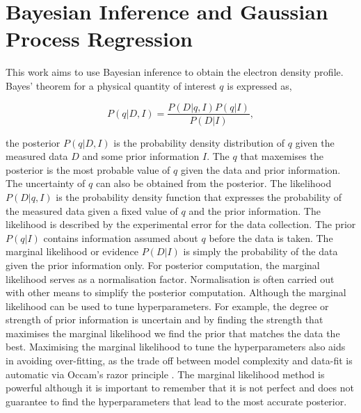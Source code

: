 \section{Bayesian Inference and Gaussian Process Regression}\label{sec:BIandGPR}

This work aims to use Bayesian inference to obtain the electron density profile. Bayes' theorem for a physical quantity of interest $q$ is expressed as,

\begin{equation} 
  P(q|D,I) = \frac{P(D|q,I) P(q|I)}{P(D|I)},
  \label{eq:bayesth}
\end{equation}

\noindent the posterior $P(q|D,I)$ is the probability density distribution of $q$ given the measured data $D$ and some prior information $I$. The $q$ that maxemises the posterior is the most probable value of $q$ given the data and prior information. The uncertainty of $q$ can also be obtained from the posterior. The likelihood $P(D|q,I)$ is the probability density function that expresses the probability of the measured data given a fixed value of $q$ and the prior information. The likelihood is described by the experimental error for the data collection. The prior $P(q|I)$ contains information assumed about $q$ before the data is taken. The marginal likelihood or evidence $P(D|I)$ is simply the probability of the data given the prior information only. For posterior computation, the marginal likelihood serves as a normalisation factor. Normalisation is often carried out with other means to simplify the posterior computation. Although the marginal likelihood can be used to tune hyperparameters. For example, the degree or strength of prior information is uncertain and by finding the strength that maximises the marginal likelihood we find the prior that matches the data the best. Maximising the marginal likelihood to tune the hyperparameters also aids in avoiding over-fitting, as the trade off between model complexity and data-fit is automatic via Occam's razor principle \cite{oscraz}. The marginal likelihood method is powerful although it is important to remember that it is not perfect and does not guarantee to find the hyperparameters that lead to the most accurate posterior.

